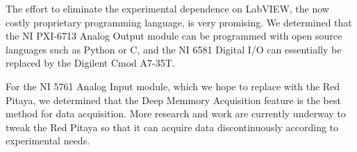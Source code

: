 The effort to eliminate the experimental dependence on LabVIEW, the now costly proprietary programming language, is very promising. We determined that the NI PXI-6713 Analog Output module can be programmed with open source languages such as Python or C, and the NI 6581 Digital I/O can essentially be replaced by the Digilent Cmod A7-35T.

For the NI 5761 Analog Input module, which we hope to replace with the Red Pitaya, we determined that the Deep Memmory Acquisition feature is the best method for data acquisition. More research and work are currently underway to tweak the Red Pitaya so that it can acquire data discontinuously according to experimental needs.